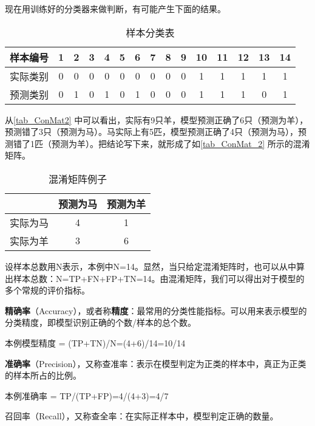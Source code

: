 现在用训练好的分类器来做判断，有可能产生下面的结果。

\begin{table}[ht]
\centering
\caption{样本分类表}\label{tab_ConMat2}
\begin{tabular}{|c|c|c|c|c|c|c|c|c|c|c|c|c|c|c|}
\hline
样本编号 & 1 & 2 & 3 & 4 & 5 & 6 & 7 & 8 & 9 & 10 & 11 & 12 & 13 & 14 \\
\hline
实际类别 & 0 & 0 & 0 & 0 & 0 & 0 & 0 & 0 & 0 & 1 & 1 & 1 & 1 & 1 \\
\hline
预测类别 & 0 & 1 & 0 & 1 & 0 & 1 & 0 & 0 & 0 & 1 & 1 & 1 & 0 & 1 \\
\hline
\end{tabular}
\end{table}

从\autoref{tab_ConMat2} 中可以看出，实际有9只羊，模型预测正确了6只（预测为羊），预测错了3只（预测为马）。马实际上有5匹，模型预测正确了4只（预测为马），预测错了1匹（预测为羊）。把结论写下来，就形成了如\autoref{tab_ConMat_2} 所示的混淆矩阵。
\begin{table}[ht]
\centering
\caption{混淆矩阵例子}\label{tab_ConMat_2}
\begin{tabular}{|c|c|c|}
\hline
 & 预测为马 & 预测为羊 \\
\hline
实际为马 & 4 & 1 \\
\hline
实际为羊 & 3 & 6 \\
\hline
\end{tabular}
\end{table}

设样本总数用N表示，本例中N=14。显然，当只给定混淆矩阵时，也可以从中算出样本总数：N=TP+FN+FP+TN=14。由混淆矩阵，我们可以得出对于模型的多个常规的评价指标。

\textbf{精确率}（Accuracy），或者称\textbf{精度}：最常用的分类性能指标。可以用来表示模型的分类精度，即模型识别正确的个数/样本的总个数。

本例模型精度 = (TP+TN)/N=(4+6)/14=10/14

\textbf{准确率}（Precision），又称查准率：表示在模型判定为正类的样本中，真正为正类的样本所占的比例。

本例准确率 = TP/(TP+FP)=4/(4+3)=4/7

召回率（Recall），又称查全率：在实际正样本中，模型判定正确的数量。

